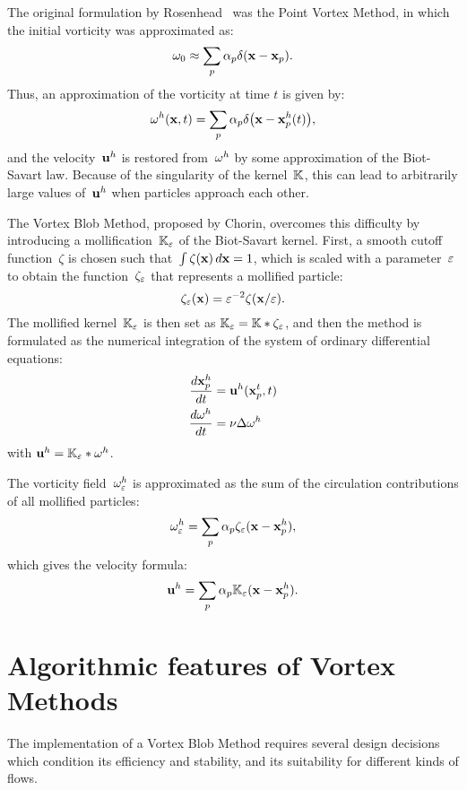The original formulation by Rosenhead~\cite{rosenhead31} was the Point Vortex Method,
in which the initial vorticity was approximated as:
\begin{equation}
  \label{eq:point-vortex-method-initial-vorticity}
  \omega_0\approx\sum_p\alpha_p\delta(\mathbf x - \mathbf x_p).
\end{equation}
Thus, an approximation of the vorticity at time \(t\) is given by:
\begin{equation}
  \label{eq:point-vortex-method-approximation}
  \omega^h(\mathbf x, t)=\sum_p\alpha_p\delta\bigl(\mathbf x - \mathbf x^h_p(t)\bigr),
\end{equation}
and the velocity~\(\mathbf u^h\) is restored from~\(\omega^h\)
by some approximation of the Biot-Savart law.
Because of the singularity of the kernel~\(\mathbb{K}\),
this can lead to arbitrarily large values of~\(\mathbf u^h\)
when particles approach each other.

The Vortex Blob Method, proposed by Chorin,
overcomes this difficulty by introducing
a mollification~\(\mathbb{K}_\varepsilon\) of the Biot-Savart kernel.
First, a smooth cutoff function~\(\zeta\) is chosen
such that~\(\int\zeta(\mathbf x)\,d\mathbf x = 1\),
which is scaled with a parameter~\(\varepsilon\)
to obtain the function~\(\zeta_\varepsilon\)
that represents a mollified particle:
\begin{equation}
  \zeta_\varepsilon(\mathbf x) = \varepsilon^{-2}\zeta(\mathbf x/\varepsilon).
\end{equation}
The mollified kernel~\(\mathbb{K}_\varepsilon\) is then set as \(\mathbb{K}_\varepsilon = \mathbb{K} * \zeta_\varepsilon\),
and then the method is formulated as the numerical integration
of the system of ordinary differential equations:
\begin{align}
  \label{eq:vortex-blob-ode}
  \frac{d\mathbf x_p^h}{dt}  &= \mathbf u^h(\mathbf x_p^t, t) \\
  \frac{d\omega^h}{dt} &= \nu\Delta\omega^h
\end{align}
with \(\mathbf u^h = \mathbb{K}_\varepsilon * \omega^h\).

The vorticity field~\(\omega_\varepsilon^h\) is approximated as the sum of the
circulation contributions of all mollified particles:
\begin{equation}
  \omega_\varepsilon^h = \sum_p\alpha_p\zeta_\varepsilon(\mathbf x - \mathbf x_p^h),
\end{equation}
which gives the velocity formula:
\begin{equation}
  \label{eq:discrete-biot-savart-law}
  \mathbf u^h = \sum_p\alpha_p\mathbb{K}_\varepsilon(\mathbf x - \mathbf x_p^h).
\end{equation}

\section{Algorithmic features of Vortex Methods}
The implementation of a Vortex Blob Method requires several design decisions
which condition its efficiency and stability,
and its suitability for different kinds of flows.

